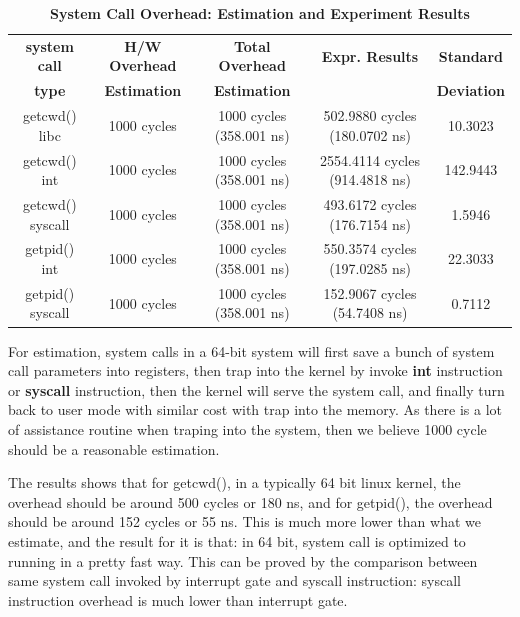 \begin{table}[ht]
  \centering
  \caption{\textbf{System Call Overhead: Estimation and Experiment Results}}
  \hspace*{-2em}\begin{threeparttable}
  \begin{tabular}{ccccc}
  \hline
     \textbf{system call} & \textbf{H/W Overhead} & \textbf{Total Overhead} & \textbf{Expr. Results} & \textbf{Standard}\\
     \textbf{type} & \textbf{Estimation}              & \textbf{Estimation}  &     & \textbf{Deviation}\\
  \hline
  getcwd() libc & 1000 cycles & 1000 cycles (358.001 ns) & 502.9880 cycles (180.0702 ns) & 10.3023 \\
  getcwd() int  & 1000 cycles & 1000 cycles (358.001 ns) & 2554.4114 cycles (914.4818 ns) & 142.9443 \\
  getcwd() syscall  & 1000 cycles & 1000 cycles (358.001 ns) & 493.6172 cycles (176.7154 ns) & 1.5946 \\
  getpid() int  & 1000 cycles & 1000 cycles (358.001 ns) & 550.3574 cycles (197.0285 ns) & 22.3033 \\
  getpid() syscall  & 1000 cycles & 1000 cycles (358.001 ns) & 152.9067 cycles (54.7408 ns) & 0.7112 \\
  \hline
  \end{tabular}
  \end{threeparttable}
  \label{measurement_syscall_table}
\end{table}

For estimation, system calls in a 64-bit system will first save a bunch of system call parameters into registers, then trap into the kernel by invoke \textbf{int} instruction or \textbf{syscall} instruction, then the kernel will serve the system call, and finally turn back to user mode with similar cost with trap into the memory. As there is a lot of assistance routine when traping into the system, then we believe 1000 cycle should be a reasonable estimation.

The results shows that for getcwd(), in a typically 64 bit linux kernel, the overhead should be around 500 cycles or 180 ns, and for getpid(), the overhead should be around 152 cycles or 55 ns. This is much more lower than what we estimate, and the result for it is that: in 64 bit, system call is optimized to running in a pretty fast way. This can be proved by the comparison between same system call invoked by interrupt gate and syscall instruction: syscall instruction overhead is much lower than interrupt gate.

